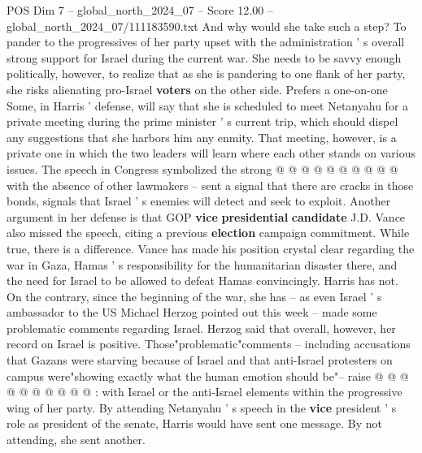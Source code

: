 \begin{textsample}{POS Dim 7 – global\_north\_2024\_07 – Score 12.00 – global\_north\_2024\_07/111183590.txt}
And why would she take such a step?
To pander to the progressives of her party upset with the administration ' s overall strong support for Israel during the current war.
She needs to be savvy enough politically, however, to realize that as she is pandering to one flank of her party, she risks alienating pro-Israel \textbf{voters} on the other side.
Prefers a one-on-one Some, in Harris ' defense, will say that she is scheduled to meet Netanyahu for a private meeting during the prime minister ' s current trip, which should dispel any suggestions that she harbors him any enmity.
That meeting, however, is a private one in which the two leaders will learn where each other stands on various issues.
The speech in Congress symbolized the strong @ @ @ @ @ @ @ @ @ @ with the absence of other lawmakers -- sent a signal that there are cracks in those bonds, signals that Israel ' s enemies will detect and seek to exploit.
Another argument in her defense is that GOP \textbf{vice} \textbf{presidential} \textbf{candidate} J.D.
Vance also missed the speech, citing a previous \textbf{election} campaign commitment.
While true, there is a difference.
Vance has made his position crystal clear regarding the war in Gaza, Hamas ' s responsibility for the humanitarian disaster there, and the need for Israel to be allowed to defeat Hamas convincingly.
Harris has not.
On the contrary, since the beginning of the war, she has -- as even Israel ' s ambassador to the US Michael Herzog pointed out this week -- made some problematic comments regarding Israel.
Herzog said that overall, however, her record on Israel is positive.
Those"problematic"comments -- including accusations that Gazans were starving because of Israel and that anti-Israel protesters on campus were"showing exactly what the human emotion should be"-- raise @ @ @ @ @ @ @ @ @ @ : with Israel or the anti-Israel elements within the progressive wing of her party.
By attending Netanyahu ' s speech in the \textbf{vice} president ' s role as president of the senate, Harris would have sent one message.
By not attending, she sent another.

\end{textsample}
